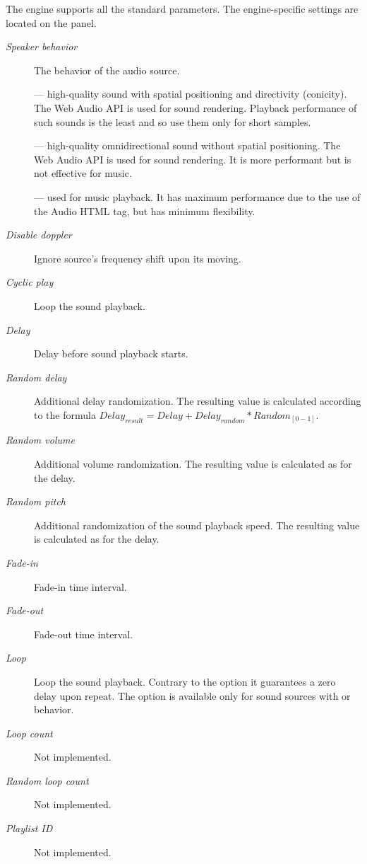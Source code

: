 \documentclass[a4paper,12pt,oneside]{sphinxmanual}
\begin{document}
The engine supports all the standard parameters. The engine-specific settings are located on the  panel.
\begin{description}
\item[{\emph{Speaker behavior}}] \leavevmode
The behavior of the audio source.

 --- high-quality sound with spatial positioning and directivity (conicity). The Web Audio API is used for sound rendering. Playback performance of such sounds is the least and so use them only for short samples.

 --- high-quality omnidirectional sound without spatial positioning. The Web Audio API is used for sound rendering. It is more performant but is not effective for music.

 --- used for music playback. It has maximum performance due to the use of the Audio HTML tag, but has minimum flexibility.

\item[{\emph{Disable doppler}}] \leavevmode
Ignore source's frequency shift upon its moving.

\item[{\emph{Cyclic play}}] \leavevmode
Loop the sound playback.

\item[{\emph{Delay}}] \leavevmode
Delay before sound playback starts.

\item[{\emph{Random delay}}] \leavevmode
Additional delay randomization. The resulting value is calculated according to the formula \(Delay_{result} = Delay + Delay_{random} * Random_{[0-1]}\).

\item[{\emph{Random volume}}] \leavevmode
Additional volume randomization. The resulting value is calculated as for the delay.

\item[{\emph{Random pitch}}] \leavevmode
Additional randomization of the sound playback speed. The resulting value is calculated as for the delay.

\item[{\emph{Fade-in}}] \leavevmode
Fade-in time interval.

\item[{\emph{Fade-out}}] \leavevmode
Fade-out time interval.

\item[{\emph{Loop}}] \leavevmode
Loop the sound playback. Contrary to the  option it guarantees a zero delay upon repeat. The option is available only for sound sources with  or  behavior.

\item[{\emph{Loop count}}] \leavevmode
Not implemented.

\item[{\emph{Random loop count}}] \leavevmode
Not implemented.

\item[{\emph{Playlist ID}}] \leavevmode
Not implemented.

\end{description}
\end{document}
